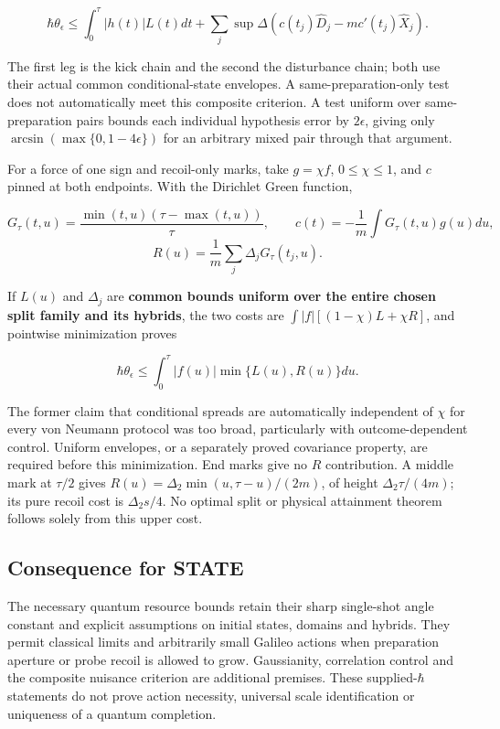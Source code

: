 \documentclass[11pt,a4paper]{article}
\begin{document}
\[\hbar\theta_\epsilon\le\int_0^\tau|h(t)|L(t)dt
 +\sum_j\sup\Delta(c(t_j)\hat D_j-mc'(t_j)\hat X_j).\]

The first leg is the kick chain and the second the disturbance chain;
both use their actual common conditional-state envelopes. A
same-preparation-only test does not automatically meet this composite
criterion. A test uniform over same-preparation pairs bounds each
individual hypothesis error by \(2\epsilon\), giving only
\(\arcsin(\max\{0,1-4\epsilon\})\) for an arbitrary mixed pair through
that argument.

For a force of one sign and recoil-only marks, take \(g=\chi f\),
\(0\le\chi\le1\), and \(c\) pinned at both endpoints. With the Dirichlet
Green function,

\[G_\tau(t,u)=\frac{\min(t,u)(\tau-\max(t,u))}{\tau},\qquad
c(t)=-\frac1m\int G_\tau(t,u)g(u)du,\]
\[R(u)=\frac1m\sum_j\Delta_jG_\tau(t_j,u).\]

If \(L(u)\) and \(\Delta_j\) are \textbf{common bounds uniform over the
entire chosen split family and its hybrids}, the two costs are
\(\int|f|[(1-\chi)L+\chi R]\), and pointwise minimization proves

\[\hbar\theta_\epsilon\le\int_0^\tau|f(u)|\min\{L(u),R(u)\}du.\]

The former claim that conditional spreads are automatically independent
of \(\chi\) for every von Neumann protocol was too broad, particularly
with outcome-dependent control. Uniform envelopes, or a separately
proved covariance property, are required before this minimization. End
marks give no \(R\) contribution. A middle mark at \(\tau/2\) gives
\(R(u)=\Delta_2\min(u,\tau-u)/(2m)\), of height \(\Delta_2\tau/(4m)\);
its pure recoil cost is \(\Delta_2s/4\). No optimal split or physical
attainment theorem follows solely from this upper cost.

\hypertarget{consequence-for-state}{%
\subsection{Consequence for STATE}\label{consequence-for-state}}

The necessary quantum resource bounds retain their sharp single-shot
angle constant and explicit assumptions on initial states, domains and
hybrids. They permit classical limits and arbitrarily small Galileo
actions when preparation aperture or probe recoil is allowed to grow.
Gaussianity, correlation control and the composite nuisance criterion
are additional premises. These supplied-\(\hbar\) statements do not
prove action necessity, universal scale identification or uniqueness of
a quantum completion.
\end{document}

